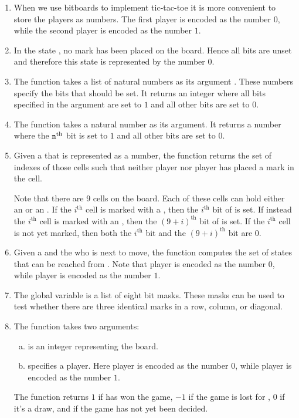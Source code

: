 \begin{enumerate}
\item When we use bitboards to implement tic-tac-toe it is more convenient to store the players as numbers. The
      first player  is encoded as the number $0$, while the second player  is encoded as
      the number $1$. 
\item In the state , no mark has been placed on the board.  Hence all bits are unset and therefore this
      state is represented by the number $0$. 
\item The function  takes a list of natural numbers as its argument .  These numbers specify
      the bits that should be set.  It returns an integer where all bits specified in the argument
       are set to $1$ and all other bits are set to $0$.
\item The function  takes a natural number  as its argument.  It returns a number
      where the $\texttt{n}^\mathrm{th}$ bit is set to $1$ and all other bits are set to $0$.
\item Given a  that is represented as a number, the function  returns the
      set of indexes of those cells such that neither player  nor player  has placed a mark
      in the cell.

      Note that there are 9 cells on the board.  Each of these cells can hold either an  or an
      .  If the $i^\textrm{th}$ cell is marked with a , then the $i^\textrm{th}$ bit of
       is set.  If instead the $i^\textrm{th}$ cell is marked with an , then the
      $(9+i)^\textrm{th}$ bit of  is set.  If the $i^\textrm{th}$ cell is not yet marked, then both the
      $i^\textrm{th}$ bit and the $(9+i)^\textrm{th}$ bit are $0$.   
\item Given a  and the  who is next to move, the function 
      computes the set of states that can be reached from .  Note that player  is
      encoded as the number $0$, while player  is encoded as the number $1$.
\item The global variable  is a list of eight bit masks.  These masks can be used to test
      whether there are three identical marks in a row, column, or diagonal. 
\item The function  takes two arguments:
      \begin{enumerate}[(a)]
      \item {}  is an integer representing the board.
      \item {} specifies a player. Here player  is encoded as the number $0$, while
            player  is encoded as the number $1$.
      \end{enumerate}
      The function returns $1$ if  has won the game, $-1$ if the game is lost for
      , $0$ if it's a draw, and  if the game has not yet been decided.
\end{enumerate}

